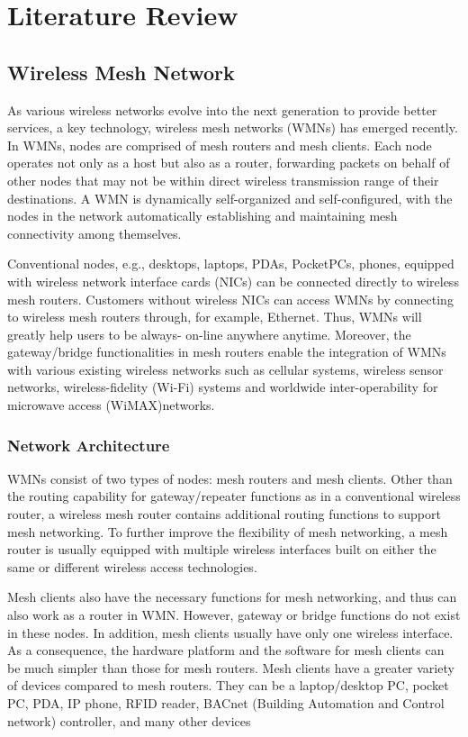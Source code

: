 \documentclass[12pt,a4paper]{report}
\begin{document}
\chapter{Literature Review}

\section{Wireless Mesh Network}
As various wireless networks evolve into the next generation to provide better services, a key technology, wireless mesh networks (WMNs) has emerged recently. In WMNs, nodes are comprised of mesh routers and mesh clients. Each node operates not only as a host but
also as a router, forwarding packets on behalf of other nodes that may not be within direct
wireless transmission range of their destinations. A WMN is dynamically self-organized and self-configured, with the nodes in the network automatically establishing and maintaining
mesh connectivity among themselves. 

Conventional nodes, e.g., desktops, laptops, PDAs, PocketPCs, phones, equipped with
wireless network interface cards (NICs) can be connected directly to wireless mesh routers.
Customers without wireless NICs can access WMNs by connecting to wireless mesh
routers through, for example, Ethernet. Thus, WMNs will greatly help users to be always-
on-line anywhere anytime. Moreover, the gateway/bridge functionalities in mesh routers
enable the integration of WMNs with various existing wireless networks such as cellular
systems, wireless sensor networks, wireless-fidelity (Wi-Fi) systems and worldwide
inter-operability for microwave access (WiMAX)networks.


\subsection{Network Architecture}
WMNs consist of two types of nodes: mesh routers and mesh clients. Other than the routing
capability for gateway/repeater functions as in a conventional wireless router, a wireless mesh
router contains additional routing functions to support mesh networking. To further improve
the flexibility of mesh networking, a mesh router is usually equipped with multiple wireless
interfaces built on either the same or different wireless access technologies.

Mesh clients also have the necessary functions for mesh networking, and thus can also
work as a router in WMN. However, gateway or bridge functions do not exist in these nodes.
In addition, mesh clients usually have only one wireless interface. As a consequence, the
hardware platform and the software for mesh clients can be much simpler than those for mesh
routers. Mesh clients have a greater variety of devices compared to mesh routers. They can be
a laptop/desktop PC, pocket PC, PDA, IP phone, RFID reader, BACnet (Building Automation
and Control network) controller, and many other devices
\end{document}
